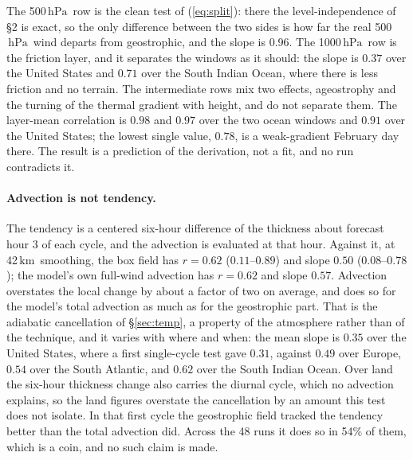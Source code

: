 \documentclass[11pt]{article}
\newcommand{\hPa}{\ensuremath{\,\mathrm{hPa}}}
\newcommand{\km}{\ensuremath{\,\mathrm{km}}}
\begin{document}
\noindent The 500\hPa\ row is the clean test of (\ref{eq:split}): there the level-independence of \S2 is exact, so the only difference between the two sides is how far the real 500\hPa\ wind departs from geostrophic, and the slope is 0.96. The 1000\hPa\ row is the friction layer, and it separates the windows as it should: the slope is $0.37$ over the United States and $0.71$ over the South Indian Ocean, where there is less friction and no terrain. The intermediate rows mix two effects, ageostrophy and the turning of the thermal gradient with height, and do not separate them. The layer-mean correlation is $0.98$ and $0.97$ over the two ocean windows and $0.91$ over the United States; the lowest single value, $0.78$, is a weak-gradient February day there. The result is a prediction of the derivation, not a fit, and no run contradicts it.

\paragraph{Advection is not tendency.} The tendency is a centered six-hour difference of the thickness about forecast hour 3 of each cycle, and the advection is evaluated at that hour. Against it, at 42\km\ smoothing, the box field has $r = 0.62$ ($0.11$--$0.89$) and slope $0.50$ ($0.08$--$0.78$); the model's own full-wind advection has $r = 0.62$ and slope $0.57$. Advection overstates the local change by about a factor of two on average, and does so for the model's total advection as much as for the geostrophic part. That is the adiabatic cancellation of \S\ref{sec:temp}, a property of the atmosphere rather than of the technique, and it varies with where and when: the mean slope is $0.35$ over the United States, where a first single-cycle test gave $0.31$, against $0.49$ over Europe, $0.54$ over the South Atlantic, and $0.62$ over the South Indian Ocean. Over land the six-hour thickness change also carries the diurnal cycle, which no advection explains, so the land figures overstate the cancellation by an amount this test does not isolate. In that first cycle the geostrophic field tracked the tendency better than the total advection did. Across the 48 runs it does so in 54\% of them, which is a coin, and no such claim is made.
\end{document}

